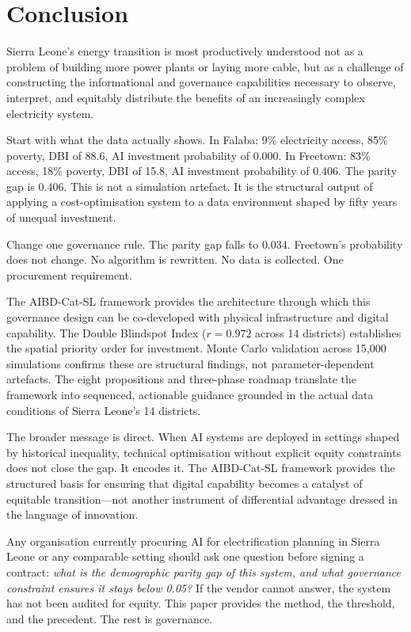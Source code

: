 \documentclass[preprint,12pt]{elsarticle}
\begin{document}
\section{Conclusion}
\label{sec:conclusion}

Sierra Leone's energy transition is most productively
understood not as a problem of building more power plants
or laying more cable, but as a challenge of constructing the
informational and governance capabilities necessary to
observe, interpret, and equitably distribute the benefits
of an increasingly complex electricity system.

Start with what the data actually shows. In Falaba:
9\% electricity access, 85\% poverty, DBI of 88.6, AI
investment probability of 0.000. In Freetown: 83\%
access, 18\% poverty, DBI of 15.8, AI investment
probability of 0.406. The parity gap is 0.406.
This is not a simulation artefact. It is the structural
output of applying a cost-optimisation system to a data
environment shaped by fifty years of unequal investment.

Change one governance rule. The parity gap falls to 0.034.
Freetown's probability does not change. No algorithm is
rewritten. No data is collected. One procurement requirement.

The AIBD-Cat-SL framework provides the architecture through
which this governance design can be co-developed with
physical infrastructure and digital capability. The
Double Blindspot Index ($r = 0.972$ across 14 districts)
establishes the spatial priority order for investment.
Monte Carlo validation across 15,000 simulations confirms
these are structural findings, not parameter-dependent
artefacts. The eight propositions and three-phase roadmap
translate the framework into sequenced, actionable guidance
grounded in the actual data conditions of Sierra Leone's 14
districts.

The broader message is direct. When AI systems are deployed
in settings shaped by historical inequality, technical
optimisation without explicit equity constraints does not
close the gap. It encodes it. The AIBD-Cat-SL framework
provides the structured basis for ensuring that digital
capability becomes a catalyst of equitable transition---not
another instrument of differential advantage dressed in
the language of innovation.

Any organisation currently procuring AI for electrification
planning in Sierra Leone or any comparable setting should
ask one question before signing a contract: \textit{what
is the demographic parity gap of this system, and what
governance constraint ensures it stays below 0.05?} If
the vendor cannot answer, the system has not been audited
for equity. This paper provides the method, the threshold,
and the precedent. The rest is governance.
\end{document}
